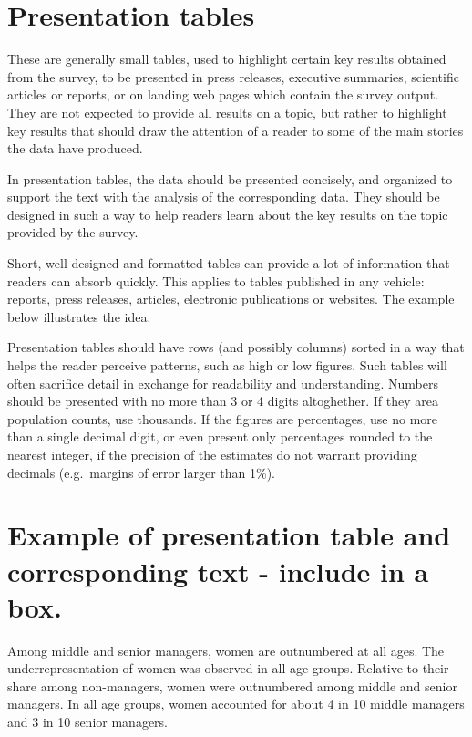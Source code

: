 \documentclass[
  12pt,
]{book}
\begin{document}
\hypertarget{presentation-tables}{%
\section{Presentation tables}\label{presentation-tables}}

These are generally small tables, used to highlight certain key results obtained from the survey, to be presented in press releases, executive summaries, scientific articles or reports, or on landing web pages which contain the survey output. They are not expected to provide all results on a topic, but rather to highlight key results that should draw the attention of a reader to some of the main stories the data have produced.

In presentation tables, the data should be presented concisely, and organized to support the text with the analysis of the corresponding data. They should be designed in such a way to help readers learn about the key results on the topic provided by the survey.

Short, well-designed and formatted tables can provide a lot of information that readers can absorb quickly. This applies to tables published in any vehicle: reports, press releases, articles, electronic publications or websites. The example below illustrates the idea.

Presentation tables should have rows (and possibly columns) sorted in a way that helps the reader perceive patterns, such as high or low figures. Such tables will often sacrifice detail in exchange for readability and understanding. Numbers should be presented with no more than 3 or 4 digits altoghether. If they area population counts, use thousands. If the figures are percentages, use no more than a single decimal digit, or even present only percentages rounded to the nearest integer, if the precision of the estimates do not warrant providing decimals (e.g.~margins of error larger than 1\%).

\hypertarget{example-of-presentation-table-and-corresponding-text---include-in-a-box.}{%
\section{Example of presentation table and corresponding text - include in a box.}\label{example-of-presentation-table-and-corresponding-text---include-in-a-box.}}

Among middle and senior managers, women are outnumbered at all ages. The underrepresentation of women was observed in all age groups. Relative to their share among non-managers, women were outnumbered among middle and senior managers. In all age groups, women accounted for about 4 in 10 middle managers and 3 in 10 senior managers.
\end{document}
